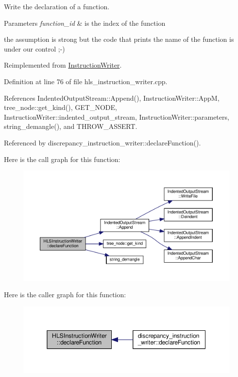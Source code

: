 Write the declaration of a function. 


\begin{DoxyParams}{Parameters}
{\em function\+\_\+id} & is the index of the function \\
\hline
\end{DoxyParams}
the assumption is strong but the code that prints the name of the function is under our control ;-\/) 

Reimplemented from \hyperlink{classInstructionWriter_adb886a6fe469c8b1142c63ee31c4a2f1}{Instruction\+Writer}.



Definition at line 76 of file hls\+\_\+instruction\+\_\+writer.\+cpp.



References Indented\+Output\+Stream\+::\+Append(), Instruction\+Writer\+::\+AppM, tree\+\_\+node\+::get\+\_\+kind(), G\+E\+T\+\_\+\+N\+O\+DE, Instruction\+Writer\+::indented\+\_\+output\+\_\+stream, Instruction\+Writer\+::parameters, string\+\_\+demangle(), and T\+H\+R\+O\+W\+\_\+\+A\+S\+S\+E\+RT.



Referenced by discrepancy\+\_\+instruction\+\_\+writer\+::declare\+Function().

Here is the call graph for this function\+:
\nopagebreak
\begin{figure}[H]
\begin{center}
\leavevmode
\includegraphics[width=350pt]{d9/d89/classHLSInstructionWriter_af6de1a6a4a37f62779bc688ad89a0a08_cgraph}
\end{center}
\end{figure}
Here is the caller graph for this function\+:
\nopagebreak
\begin{figure}[H]
\begin{center}
\leavevmode
\includegraphics[width=345pt]{d9/d89/classHLSInstructionWriter_af6de1a6a4a37f62779bc688ad89a0a08_icgraph}
\end{center}
\end{figure}


